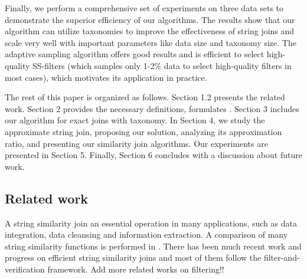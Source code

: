 



\smallskip

Finally, we perform a comprehensive set of experiments on three data sets to demonstrate the superior efficiency of our algorithms. The results show that our algorithm can utilize taxonomies to improve the effectiveness of string joins  and  scale very well with important parameters like data size and taxonomy size. The adaptive sampling algorithm offers good results and is efficient to select high-quality SS-filters (which samples only 1-2\% data to select high-quality filters in most cases), which motivates its application in practice.


\smallskip

The rest of this paper is organized as follows. Section 1.2 presents the related work. Section 2
provides the necessary definitions, formulates . Section
3 includes our algorithm for exact joins with taxonomy. In Section 4, we study
the approximate string join, proposing our solution, analyzing its approximation
ratio, and presenting our similarity join algorithms.
Our experiments are presented in Section 5. Finally,
Section 6 concludes with a discussion about future work.

\subsection{Related work}

A string similarity join an essential operation in
 many applications, such as data integration, data cleansing and information extraction.  A comparison of many string similarity functions is performed in \cite{conf/ijcai/CohenRF03}. There has been much recent work and progress on efficient string similarity joins  \cite{conf/sigmod/LuLWLW13,conf/icde/ArasuCK08,conf/cpm/BarbayGMR06,conf/vldb/ArvindSR09} and most of them follow the filter-and-verification framework.  Add more related works on filtering!!
 
